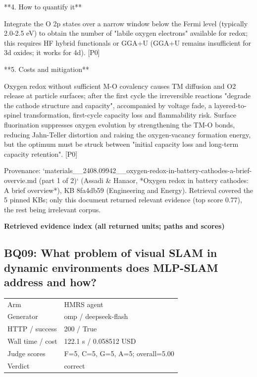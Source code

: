 \documentclass[10pt]{article}
\begin{document}
\begin{AnswerText}
**4. How to quantify it**

Integrate the O 2p states over a narrow window below the Fermi level (typically 2.0-2.5 eV) to obtain the number of "labile oxygen electrons" available for redox; this requires HF hybrid functionals or GGA+U (GGA+U remains insufficient for 3d oxides; it works for 4d). [P0]

**5. Costs and mitigation**

Oxygen redox without sufficient M-O covalency causes TM diffusion and O2 release at particle surfaces; after the first cycle the irreversible reactions "degrade the cathode structure and capacity", accompanied by voltage fade, a layered-to-spinel transformation, first-cycle capacity loss and flammability risk. Surface fluorination suppresses oxygen evolution by strengthening the TM-O bonds, reducing Jahn-Teller distortion and raising the oxygen-vacancy formation energy, but the optimum must be struck between "initial capacity loss and long-term capacity retention". [P0]

Provenance: `materials__2408.09942__oxygen-redox-in-battery-cathodes-a-brief-overvie.md (part 1 of 2)` (Assadi & Hanaor, *Oxygen redox in battery cathodes: A brief overview*), KB 8fa4db59 (Engineering and Energy). Retrieval covered the 5 pinned KBs; only this document returned relevant evidence (top score 0.77), the rest being irrelevant corpus.
\end{AnswerText}

\textbf{Retrieved evidence index (all returned units; paths and scores) }
\begin{EvidenceText}
\end{EvidenceText}
\subsection{BQ09: What problem of visual SLAM in dynamic environments does MLP-SLAM address and how?}
\begin{tabular}{@{}ll@{}}
Arm & HMRS agent\\
Generator & omp / deepseek-flash\\
HTTP / success & 200 / True\\
Wall time / cost & 122.1 s / 0.058512 USD\\
Judge scores & F=5, C=5, G=5, A=5; overall=5.00\\
Verdict & correct\\
\end{tabular}
\end{document}
